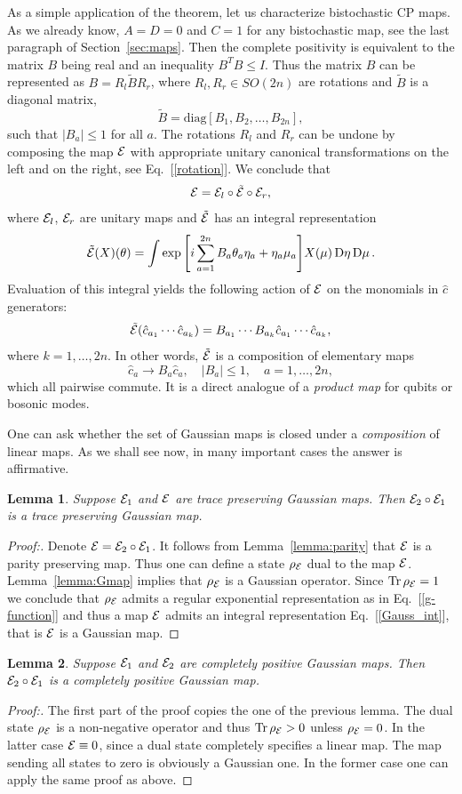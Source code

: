 \documentclass[twocolumn,showpacs,preprintnumbers,superscriptaddress]{revtex4}
\newtheorem{lemma}{Lemma}
\newcommand{\calE}{{\cal E }}
\newcommand{\D}[1]{\mathop{\mathrm{D}#1}}
\newcommand{\cop}{{\hat{c}}}
\DeclareMathOperator*{\tr}{\mathop{\mathrm{Tr}}}
\begin{document}
As a simple application of the theorem, let us characterize bistochastic
CP maps. As we already know, $A=D=0$ and $C=1$ for any bistochastic map,
see the last paragraph of Section~\ref{sec:maps}. Then the complete positivity
is equivalent to the matrix $B$ being real and an inequality $B^T B \le I$.
Thus the matrix $B$ can be represented as $B=R_l \tilde{B} R_r$,
where $R_l,R_r\in SO(2n)$ are rotations and $\tilde{B}$ is a diagonal
matrix,
\[
\tilde{B}=\mbox{diag}[B_1,B_2,\ldots,B_{2n}], 
\]
such that $|B_a|\le 1$ for all $a$. The rotations $R_l$ and $R_r$ can be
undone by composing the map $\calE$ with appropriate unitary canonical 
transformations on the left and on the right, see Eq.~[\ref{rotation}].
We conclude that 
\[
\calE=\calE_l\circ \tilde{\calE}\circ \calE_r,
\]
where $\calE_l$, $\calE_r$ are unitary maps and $\tilde{\calE}$ has
an integral representation
\[
\tilde{\calE}(X)(\theta) =  \int \exp{\left[ i\sum_{a=1}^{2n}
 B_a \theta_a \eta_a
 +  \eta_a \mu_a  \right]}
X(\mu) \D{\eta}\D{\mu}.
\]
Evaluation of this integral yields the following action of $\calE$
on the monomials in $\cop$ generators:
\[
\tilde{\calE}(\cop_{a_1}\cdots\cop_{a_k})=B_{a_1}\cdots B_{a_k}  \cop_{a_1}
\cdots\cop_{a_k},
\]
where $k=1,\ldots,2n$.
In other words, $\tilde{\calE}$ is a composition of 
elementary maps 
\[
\cop_a\to B_a\cop_a, \quad |B_a|\le 1, \quad a=1,\ldots,2n,
\]
which all pairwise commute.
It is a direct analogue of a {\it product map} for qubits or bosonic modes.


One can ask whether the set of Gaussian maps is closed under a {\it composition}
of linear maps. As we shall see now, in many important cases
the answer is affirmative. 
\begin{lemma}\label{lemma:compos1}
Suppose $\calE_1$ and $\calE$ are trace preserving Gaussian maps.
Then $\calE_2\circ \calE_1$ is a trace preserving Gaussian map.
\end{lemma}
\begin{proof}[Proof:]
Denote $\calE=\calE_2\circ\calE_1$. It follows from Lemma~\ref{lemma:parity}
that $\calE$ is a parity preserving map. Thus one can define a state
$\rho_{\calE}$ dual to the map $\calE$. Lemma~\ref{lemma:Gmap}
implies that $\rho_{\calE}$ is a Gaussian operator.
Since $\tr{\rho_{\calE}}=1$ we conclude that $\rho_{\calE}$
admits a regular exponential representation as in Eq.~[\ref{g-function}]
and thus a map $\calE$ admits an integral representation Eq.~[\ref{Gauss_int}],
that is $\calE$ is a Gaussian map.
\end{proof}
%
%
\begin{lemma}\label{lemma:compos2}
Suppose $\calE_1$ and $\calE_2$ are completely positive Gaussian maps.
Then $\calE_2\circ \calE_1$ is a completely positive Gaussian map.
\end{lemma}
\begin{proof}[Proof:]
The first part of the proof copies the one of the previous lemma.
The dual state $\rho_{\calE}$ is a non-negative operator and thus
$\tr{\rho_{\calE}}>0$ unless $\rho_{\calE}=0$. In the latter case
$\calE\equiv 0$, since a dual state completely specifies a linear map.
The map sending all states to zero is obviously a Gaussian one.  
In the former case one can apply the same proof as above.
\end{proof}
\end{document}
